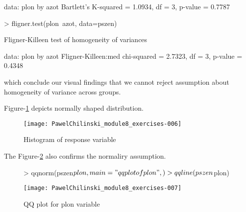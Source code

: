 \documentclass[a4paper]{article}
\begin{document}
\begin{itemize}
\begin{itemize}
\begin{Schunk}
\begin{Soutput}
data:  plon by azot
Bartlett's K-squared = 1.0934, df = 3, p-value = 0.7787
\end{Soutput}
\begin{Sinput}
> fligner.test(plon~azot, data=pszen)
\end{Sinput}
\begin{Soutput}
	Fligner-Killeen test of homogeneity of variances

data:  plon by azot
Fligner-Killeen:med chi-squared = 2.7323, df = 3, p-value = 0.4348
\end{Soutput}
\end{Schunk}
which conclude our visual findings that we cannot reject assumption about
homogeneity of variance across groups.

Figure-\ref{HIST_PLON} depicts normally shaped distribution.
\begin{figure}[H]
\begin{center}
\begin{Schunk}
\end{Schunk}
\texttt{[image: PawelChilinski\_module8\_exercises-006]}
\caption{Histogram of response variable}
\label{HIST_PLON}
\end{center}
\end{figure}

The Figure-\ref{QQ_PLOT_PLON} also confirms the normaliry assumption. 
\begin{figure}[H]
\begin{center}
\begin{Schunk}
\begin{Sinput}
> qqnorm(pszen$plon,main="qq plot of plon",)
> qqline(pszen$plon)
\end{Sinput}
\end{Schunk}
\texttt{[image: PawelChilinski\_module8\_exercises-007]}
\caption{QQ plot for plon variable}
\label{QQ_PLOT_PLON}
\end{center}
\end{figure}


\end{itemize}
\end{itemize}
\end{document}
